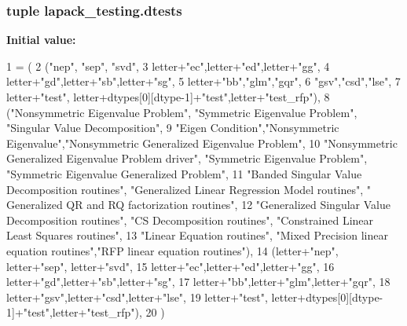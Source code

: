 \subsubsection[{dtests}]{\setlength{\rightskip}{0pt plus 5cm}tuple lapack\+\_\+testing.\+dtests}\label{namespacelapack__testing_af43b367bf5e56b4e2c5875a70c4ec379}
{\bfseries Initial value\+:}
\begin{DoxyCode}
1 = (
2   (\textcolor{stringliteral}{"nep"}, \textcolor{stringliteral}{"sep"}, \textcolor{stringliteral}{"svd"},
3   letter+\textcolor{stringliteral}{"ec"},letter+\textcolor{stringliteral}{"ed"},letter+\textcolor{stringliteral}{"gg"},
4   letter+\textcolor{stringliteral}{"gd"},letter+\textcolor{stringliteral}{"sb"},letter+\textcolor{stringliteral}{"sg"},
5   letter+\textcolor{stringliteral}{"bb"},\textcolor{stringliteral}{"glm"},\textcolor{stringliteral}{"gqr"},
6   \textcolor{stringliteral}{"gsv"},\textcolor{stringliteral}{"csd"},\textcolor{stringliteral}{"lse"},
7   letter+\textcolor{stringliteral}{"test"}, letter+dtypes[0][dtype-1]+\textcolor{stringliteral}{"test"},letter+\textcolor{stringliteral}{"test\_rfp"}),
8   (\textcolor{stringliteral}{"Nonsymmetric Eigenvalue Problem"}, \textcolor{stringliteral}{"Symmetric Eigenvalue Problem"}, \textcolor{stringliteral}{"Singular Value Decomposition"},
9   \textcolor{stringliteral}{"Eigen Condition"},\textcolor{stringliteral}{"Nonsymmetric Eigenvalue"},\textcolor{stringliteral}{"Nonsymmetric Generalized Eigenvalue Problem"},
10   \textcolor{stringliteral}{"Nonsymmetric Generalized Eigenvalue Problem driver"}, \textcolor{stringliteral}{"Symmetric Eigenvalue Problem"}, \textcolor{stringliteral}{"Symmetric
       Eigenvalue Generalized Problem"},
11   \textcolor{stringliteral}{"Banded Singular Value Decomposition routines"}, \textcolor{stringliteral}{"Generalized Linear Regression Model routines"}, \textcolor{stringliteral}{"
      Generalized QR and RQ factorization routines"},
12   \textcolor{stringliteral}{"Generalized Singular Value Decomposition routines"}, \textcolor{stringliteral}{"CS Decomposition routines"}, \textcolor{stringliteral}{"Constrained Linear
       Least Squares routines"},
13   \textcolor{stringliteral}{"Linear Equation routines"}, \textcolor{stringliteral}{"Mixed Precision linear equation routines"},\textcolor{stringliteral}{"RFP linear equation routines"}),
14   (letter+\textcolor{stringliteral}{"nep"}, letter+\textcolor{stringliteral}{"sep"}, letter+\textcolor{stringliteral}{"svd"},
15   letter+\textcolor{stringliteral}{"ec"},letter+\textcolor{stringliteral}{"ed"},letter+\textcolor{stringliteral}{"gg"},
16   letter+\textcolor{stringliteral}{"gd"},letter+\textcolor{stringliteral}{"sb"},letter+\textcolor{stringliteral}{"sg"},
17   letter+\textcolor{stringliteral}{"bb"},letter+\textcolor{stringliteral}{"glm"},letter+\textcolor{stringliteral}{"gqr"},
18   letter+\textcolor{stringliteral}{"gsv"},letter+\textcolor{stringliteral}{"csd"},letter+\textcolor{stringliteral}{"lse"},
19   letter+\textcolor{stringliteral}{"test"}, letter+dtypes[0][dtype-1]+\textcolor{stringliteral}{"test"},letter+\textcolor{stringliteral}{"test\_rfp"}),
20   )
\end{DoxyCode}
